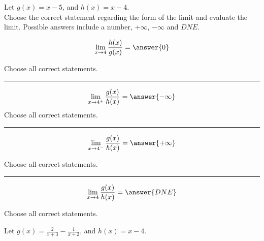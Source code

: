\documentclass{ximera}
\author{Nela Lakos}
\begin{document}
\begin{exercise}

Let $g(x) = x-5$, and $h(x) = x-4$.\\

Choose the correct statement regarding  the form of the limit and evaluate the limit. Possible answers include a number, $+\infty$, $-\infty$ and $DNE$.

\[
\lim_{x\to4}\frac{h(x)}{g(x)} = \answer{0}
\]



Choose all correct statements.
\begin{selectAll} 
\end{selectAll}

\noindent\rule[0.5ex]{\linewidth}{0.2pt}
\[
\lim_{x\to4^{+}}\frac{g(x)}{h(x)} = \answer{-\infty}
\]
Choose all correct statements.
\begin{selectAll} 
\end{selectAll}

\noindent\rule[0.5ex]{\linewidth}{0.2pt}

\[
\lim_{x\to4^{-}}\frac{g(x)}{h(x)} = \answer{+\infty}
\]

Choose all correct statements.
\begin{selectAll} 
\end{selectAll}


\noindent\rule[0.5ex]{\linewidth}{0.2pt}
\[
\lim_{x\to4}\frac{g(x)}{h(x)} = \answer{DNE}
\]

Choose all correct statements.
\begin{selectAll} 
\end{selectAll}

\begin{exercise}
Let $g(x) = \frac{2}{x+3}-\frac{1}{x+2}$, and $h(x) = x-4$.\\\\


\end{exercise}
\end{exercise}
\end{document}
